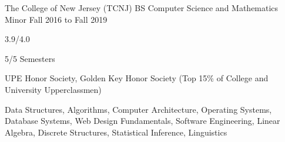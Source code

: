 
\begin{cventry}
    {The College of New Jersey (TCNJ)}
    {BS Computer Science and Mathematics Minor}
    {Fall 2016 to Fall 2019}{}{}
    \begin{cvitems}
        \item {} 3.9/4.0
        \item {} 5/5 Semesters
        \item {} UPE Honor Society, Golden Key Honor Society (Top 15\% of College and University Upperclassmen)
        \item {} Data Structures, Algorithms, Computer Architecture, Operating Systems, Database Systems, Web Design Fundamentals, Software Engineering, Linear Algebra, Discrete Structures, Statistical Inference, Linguistics
    \end{cvitems}
\end{cventry}

